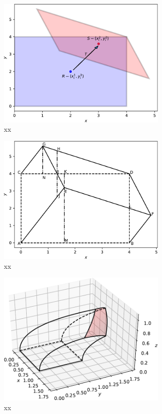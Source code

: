 \documentclass{article}
\theoremstyle{theorem}
\theoremstyle{definition}
\begin{document}
\begin{figure}[htb]
\centering
\includegraphics[width=0.75\textwidth]{prismatoid_regions.pdf}
\caption{xx}
\label{fig:prismatoid_regions}
\end{figure}

\begin{figure}[htb]
\centering
\includegraphics[width=0.75\textwidth]{prismatoid_xy.pdf}
\caption{xx}
\label{fig:prismatoid_xy}
\end{figure}

\begin{figure}[htb]
\centering
\includegraphics[width=0.75\textwidth]{sphere_solid.pdf}
\caption{xx}
\label{fig:sphere_solid}
\end{figure}
\end{document}

